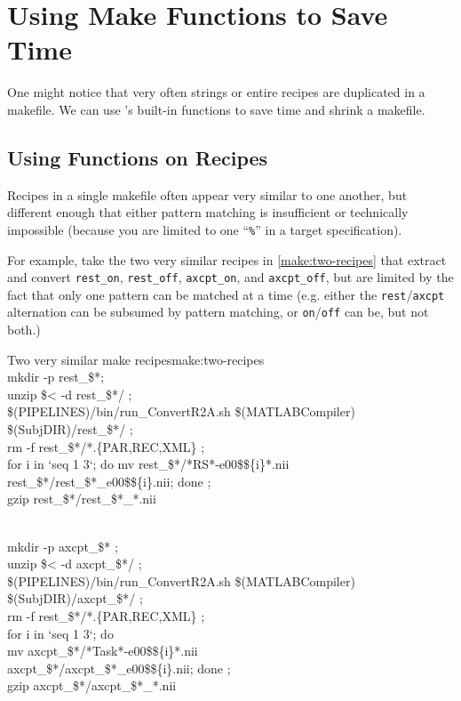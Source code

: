 \section{Using Make Functions to Save Time}

One might notice that very often strings or entire recipes are duplicated in a makefile. We can use \maken{}'s built-in functions to save time and shrink a makefile.

\subsection{Using Functions on Recipes}

Recipes in a single makefile often appear very similar to one another, but different enough that either pattern matching is insufficient or technically impossible (because you are limited to one ``\texttt{\%}'' in a target specification).

For example, take the two very similar recipes in \autoref{make:two-recipes} that extract and convert \texttt{rest_on}, \texttt{rest_off}, \texttt{axcpt_on}, and \texttt{axcpt_off}, but are limited by the fact that only one pattern can be matched at a time (e.g. either the \texttt{rest}/\texttt{axcpt} alternation can be subsumed by pattern matching, or \texttt{on}/\texttt{off} can be, but not both.)

\begin{make}{Two very similar make recipes}{make:two-recipes}
	 \\
	\tab mkdir -p rest_\$*;\ \\
	\tab unzip \$< -d rest_\$*/ ;\ \\
	\tab \$(PIPELINES)/bin/run_ConvertR2A.sh \$(MATLABCompiler) \$(SubjDIR)/rest_\$*/ ;\ \\
	\tab rm -f rest_\$*/*.\{PAR,REC,XML\} ;\ \\
	\tab for i in `seq 1 3`; do mv rest_\$*/*RS*-e00\$\$\{i\}*.nii \ \\
	\tab rest_\$*/rest_\$*_e00\$\$\{i\}.nii; done ;\ \\
	\tab gzip rest_\$*/rest_\$*_*.nii 
	
	\vspace{\baselineskip}
	
	 \\
	\tab mkdir -p axcpt_\$* ;\  \\
	\tab unzip \$< -d axcpt_\$*/ ;\ \\
	\tab \$(PIPELINES)/bin/run_ConvertR2A.sh \$(MATLABCompiler) \$(SubjDIR)/axcpt_\$*/ ;\ \\
	\tab rm -f rest_\$*/*.\{PAR,REC,XML\} ;\ \\
	\tab for i in `seq 1 3`; do \ \\
	\tab mv axcpt_\$*/*Task*-e00\$\$\{i\}*.nii\\ axcpt_\$*/axcpt_\$*_e00\$\$\{i\}.nii; done ;\ \\
	\tab gzip axcpt_\$*/axcpt_\$*_*.nii
\end{make}

